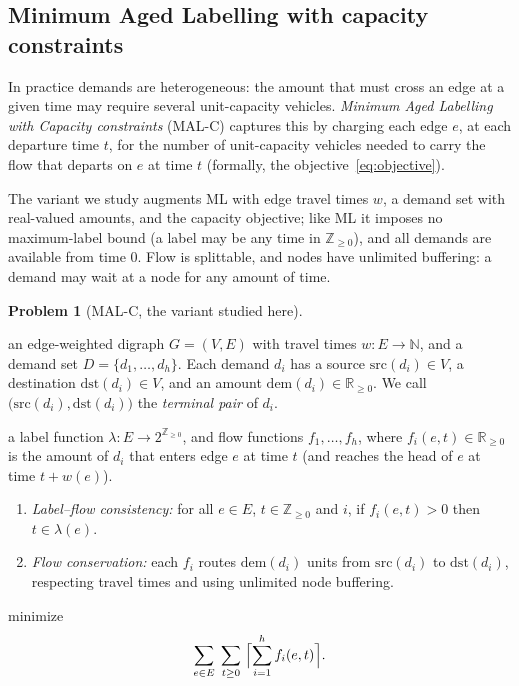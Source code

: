 \documentclass[11pt]{article}
\theoremstyle{definition}
\newtheorem{problem}{Problem}
\theoremstyle{remark}
\newcommand{\src}{\mathrm{src}}
\newcommand{\dst}{\mathrm{dst}}
\newcommand{\dem}{\mathrm{dem}}
\newcommand{\Zzero}{\mathbb{Z}_{\ge 0}}
\begin{document}
\subsection{Minimum Aged Labelling with capacity constraints}\label{sec:malc}

In practice demands are heterogeneous: the amount that must cross an edge at a given time may require
several unit-capacity vehicles. \emph{Minimum Aged Labelling with Capacity constraints} (MAL-C)
captures this by charging each edge $e$, at each departure time $t$, for the number of unit-capacity
vehicles needed to carry the flow that departs on $e$ at time $t$ (formally, the
objective~\eqref{eq:objective}).

The variant we study augments ML with edge travel times $w$, a demand set with real-valued amounts,
and the capacity objective; like ML it imposes no maximum-label bound (a label may be any time in
$\Zzero$), and all demands are available from time $0$. Flow is splittable, and nodes have unlimited
buffering: a demand may wait at a node for any amount of time.

\begin{problem}[MAL-C, the variant studied here]\label{prob:malc}
\leavevmode
\begin{description}[topsep=2pt,itemsep=1pt,leftmargin=6.5em,style=nextline]
  \item[\textnormal{Input:}] an edge-weighted digraph $G=(V,E)$ with travel times $w:E\to\mathbb{N}$,
        and a demand set $D=\{d_1,\dots,d_h\}$. Each demand $d_i$ has a source $\src(d_i)\in V$, a
        destination $\dst(d_i)\in V$, and an amount $\dem(d_i)\in\mathbb{R}_{\ge0}$. We call
        $\bigl(\src(d_i),\dst(d_i)\bigr)$ the \emph{terminal pair} of $d_i$.
  \item[\textnormal{Output:}] a label function $\lambda:E\to 2^{\Zzero}$, and flow functions
        $f_1,\dots,f_h$, where $f_i(e,t)\in\mathbb{R}_{\ge0}$ is the amount of $d_i$ that enters edge
        $e$ at time $t$ (and reaches the head of $e$ at time $t+w(e)$).
  \item[\textnormal{Constraints:}]
    \begin{enumerate}[topsep=1pt,itemsep=1pt,label=(\roman*)]
      \item \emph{Label--flow consistency:} for all $e\in E$, $t\in\Zzero$ and $i$, if $f_i(e,t)>0$
            then $t\in\lambda(e)$.
      \item \emph{Flow conservation:} each $f_i$ routes $\dem(d_i)$ units from $\src(d_i)$ to
            $\dst(d_i)$, respecting travel times and using unlimited node buffering.
    \end{enumerate}
  \item[\textnormal{Objective:}] minimize
    \begin{equation}\label{eq:objective}
      \sum_{e\in E}\;\sum_{t\ge 0}\;
      \Bigl\lceil \sum_{i=1}^{h} f_i(e,t) \Bigr\rceil .
    \end{equation}
\end{description}
\end{problem}
\end{document}
